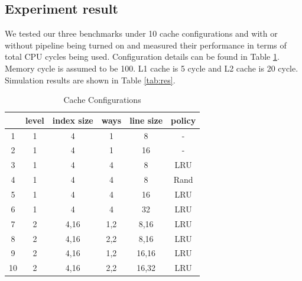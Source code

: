 \documentclass{sig-alternate}
\begin{document}
\subsection{Experiment result}
We tested our three benchmarks under 10 cache configurations and with or without pipeline being turned on and measured their performance in terms of total CPU cycles being used. Configuration details can be found in Table \ref{tab:conf}. Memory cycle is assumed to be 100. L1 cache is 5 cycle and L2 cache is 20 cycle. Simulation results are shown in Table \ref{tab:res}. 
\begin{table}[!ht]
\caption{Cache Configurations}
\label{tab:conf}
\centering
\begin{tabular}{|c|c|c|c|c|c|}
\hline
 & level & index size & ways & line size & policy \\ \hline
 1 & 1& 4 & 1& 8& -\\
\hline
 2 & 1& 4 & 1& 16 & -\\
\hline
 3 & 1& 4 & 4& 8& LRU\\
\hline
 4 & 1& 4 & 4& 8& Rand\\
\hline
 5 & 1& 4 & 4& 16& LRU\\
\hline
 6 & 1& 4 & 4& 32& LRU\\
\hline
 7 & 2 & 4,16 & 1,2& 8,16& LRU\\
\hline
 8 & 2 & 4,16 & 2,2& 8,16& LRU\\
\hline
 9 & 2 & 4,16 & 1,2& 16,16& LRU\\
\hline
 10 & 2 & 4,16 & 2,2& 16,32& LRU\\
\hline
\end{tabular}
\end{table}
\end{document}
